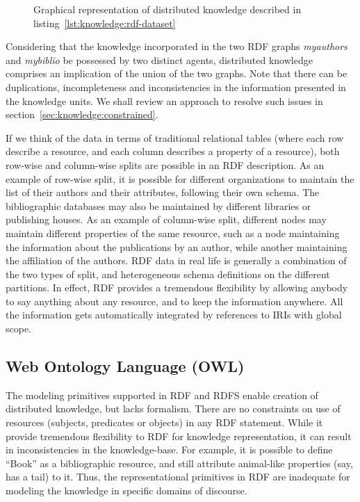 \begin{figure}[!htbp]
	\centerline {
	}
	\caption{Graphical representation of distributed knowledge described in listing~\ref{lst:knowledge:rdf-dataset}}
	\label{fig:knowledge:rdf-dataset}
\end{figure}

Considering that the knowledge incorporated in the two RDF graphs {\it myauthors} and {\it mybiblio} be possessed by two distinct
agents, distributed knowledge comprises an implication of the union of the two graphs. Note that there can be duplications, 
incompleteness and inconsistencies in the information presented in the knowledge units. We shall review an approach to resolve
such issues in section~\ref{sec:knowledge:constrained}.

 
If we think of the data in terms of traditional relational tables (where each row describe a resource, and each column describes a 
property of a resource), both row-wise and column-wise splits are possible in an RDF description. As an example of row-wise split, 
it is possible for different organizations to maintain the list of their authors and their attributes, following their own schema. 
The bibliographic databases may also be maintained by different libraries or publishing houses.
%
As an example of column-wise split, different nodes may maintain different properties of the same resource, such as a node maintaining 
the information about the publications by an author, while another maintaining the affiliation of the authors. RDF data in real life
is generally a combination of the two types of split, and heterogeneous schema definitions on the different partitions. In effect, RDF 
provides a tremendous flexibility by allowing anybody to say anything about any resource, and to keep the information anywhere. All the 
information gets automatically integrated by references to IRIs with global scope.

\subsection{Web Ontology Language (OWL)}

The modeling primitives supported in RDF and RDFS enable creation of distributed knowledge, but lacks formalism. There are no
constraints on use of resources (subjects, predicates or objects) in any RDF statement. While it provide tremendous flexibility
to RDF for knowledge representation, it can result in inconsistencies in the knowledge-base. For example, it is possible to define 
``Book'' as a bibliographic resource, and still attribute animal-like properties (say, has a tail) to it. Thus, the representational 
primitives in RDF are inadequate for modeling the knowledge in specific domains of discourse.

